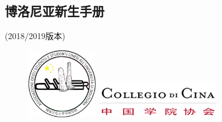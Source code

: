 \documentclass[3pt,a5paper,openright,twoside]{book}
\begin{document}
% 
%
%
%


% 
%
%
%



\begin{titlepage}                  

\topmargin=-2cm 

\chapter*{博洛尼亚新生手册}                 %
\pagestyle{empty}%
\thispagestyle{empty} 
	\begin{center}
	(2018/2019版本)
	\end{center}

\vspace*{0.5cm}

\begin{figure}[H]
  \centering
  \begin{minipage}[b]{0.4\textwidth}
    \includegraphics[width=3cm]{figures/asscubo.png}
  \end{minipage}
  \hfill
  \begin{minipage}[b]{0.4\textwidth}
    \includegraphics[width=\textwidth]{figures/logo.png}
  \end{minipage}
\end{figure}


\end{titlepage}
\end{document}
